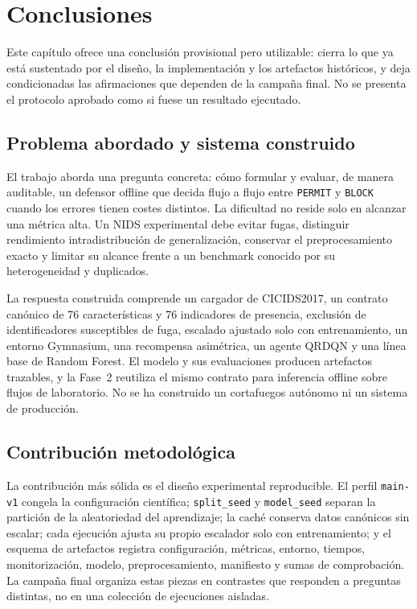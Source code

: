 \chapter{Conclusiones}

Este capítulo ofrece una conclusión provisional pero utilizable: cierra lo que ya está sustentado por el diseño, la implementación y los artefactos históricos, y deja condicionadas las afirmaciones que dependen de la campaña final. No se presenta el protocolo aprobado como si fuese un resultado ejecutado.

\section{Problema abordado y sistema construido}

El trabajo aborda una pregunta concreta: cómo formular y evaluar, de manera auditable, un defensor offline que decida flujo a flujo entre \texttt{PERMIT} y \texttt{BLOCK} cuando los errores tienen costes distintos. La dificultad no reside solo en alcanzar una métrica alta. Un NIDS experimental debe evitar fugas, distinguir rendimiento intradistribución de generalización, conservar el preprocesamiento exacto y limitar su alcance frente a un benchmark conocido por su heterogeneidad y duplicados.

La respuesta construida comprende un cargador de CICIDS2017, un contrato canónico de 76 características y 76 indicadores de presencia, exclusión de identificadores susceptibles de fuga, escalado ajustado solo con entrenamiento, un entorno Gymnasium, una recompensa asimétrica, un agente QRDQN y una línea base de Random Forest. El modelo y sus evaluaciones producen artefactos trazables, y la Fase~2 reutiliza el mismo contrato para inferencia offline sobre flujos de laboratorio. No se ha construido un cortafuegos autónomo ni un sistema de producción.

\section{Contribución metodológica}

La contribución más sólida es el diseño experimental reproducible. El perfil \texttt{main-v1} congela la configuración científica; \texttt{split\_seed} y \texttt{model\_seed} separan la partición de la aleatoriedad del aprendizaje; la caché conserva datos canónicos sin escalar; cada ejecución ajusta su propio escalador solo con entrenamiento; y el esquema de artefactos registra configuración, métricas, entorno, tiempos, monitorización, modelo, preprocesamiento, manifiesto y sumas de comprobación. La campaña final organiza estas piezas en contrastes que responden a preguntas distintas, no en una colección de ejecuciones aisladas.

